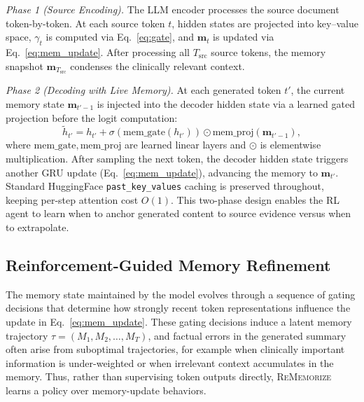 \documentclass{article}
\begin{document}
\textit{Phase 1 (Source Encoding).}
The LLM encoder processes the source document token-by-token.
At each source token $t$, hidden states are projected into key--value space, $\gamma_t$ is computed via Eq.~\ref{eq:gate}, and $\mathbf{m}_t$ is updated via Eq.~\ref{eq:mem_update}.
After processing all $T_{\text{src}}$ source tokens, the memory snapshot $\mathbf{m}_{T_{\text{src}}}$ condenses the clinically relevant context.

\textit{Phase 2 (Decoding with Live Memory).}
At each generated token $t'$, the current memory state $\mathbf{m}_{t'-1}$ is injected into the decoder hidden state via a learned gated projection before the logit computation:
\begin{equation}
\label{eq:inject}
\tilde{h}_{t'} = h_{t'} + \sigma\!\left(\mathrm{mem\_gate}(h_{t'})\right) \odot \mathrm{mem\_proj}(\mathbf{m}_{t'-1}),
\end{equation}
where $\mathrm{mem\_gate}, \mathrm{mem\_proj}$ are learned linear layers and $\odot$ is elementwise multiplication.
After sampling the next token, the decoder hidden state triggers another GRU update (Eq.~\ref{eq:mem_update}), advancing the memory to $\mathbf{m}_{t'}$.
Standard HuggingFace \texttt{past\_key\_values} caching is preserved throughout, keeping per-step attention cost $O(1)$.
This two-phase design enables the RL agent to learn when to anchor generated content to source evidence versus when to extrapolate.

\subsection{Reinforcement-Guided Memory Refinement}

The memory state maintained by the model evolves through a sequence of gating decisions that determine how strongly recent token representations influence the update in Eq.~\ref{eq:mem_update}.
These gating decisions induce a latent memory trajectory
$\tau = (M_1, M_2, \ldots, M_T)$,
and factual errors in the generated summary often arise from suboptimal trajectories, for example when clinically important information is under-weighted or when irrelevant context accumulates in the memory.
Thus, rather than supervising token outputs directly, \textsc{ReMemorize} learns a policy over memory-update behaviors.
\end{document}
